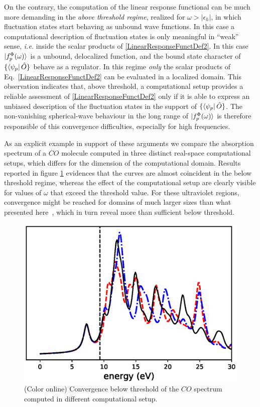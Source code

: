 \documentclass[reprint,aps,prb]{revtex4-1}
\newcommand{\eps}{\epsilon}
\newcommand{\op}[1]{\hat {#1}}
\begin{document}
On the contrary, the computation of the linear response functional can be much more demanding in the \emph{above threshold regime}, realized for $\omega>|\eps_h|$, in which fluctuation 
states start behaving as unbound wave functions. In this case a computational description of fluctuation states is only meaningful in ``weak'' sense,
\emph{i.e.} inside the scalar products of 
\eqref{LinearResponseFunctDef2}. 
In this case $\ket{f_p^\Phi(\omega)}$ is a unbound, delocalized function, and 
the bound state character of $\{\bra{\psi_p}\op O\}$ behave as a regulator. 
In this regime \emph{only} the scalar products of Eq.~\eqref{LinearResponseFunctDef2} can be evaluated in a localized domain.
This observation indicates that, above threshold, a computational setup 
provides a reliable assessment of \eqref{LinearResponseFunctDef2} only if it is able to express an
unbiased description of the fluctuation states in the support of $\{\bra{\psi_p}\op O\}$.
The non-vanishing spherical-wave behaviour in the long range of $\ket{f_p^\Phi(\omega)}$ is therefore responsible
of this convergence difficulties, especially for high frequencies.

As an explicit example in support of these arguments we compare the absorption spectrum of a $CO$ molecule computed in 
three distinct real-space computational setups, which differs for the dimension of 
the computational domain. Results reported in figure \ref{co_spectrum} evidences that the curves are almost coincident in the below threshold regime,
whereas the effect of the computational setup are clearly visible for values of $\omega$ that exceed the threshold value.
For these ultraviolet regions, convergence might be reached for domains of much larger sizes than what presented here~\cite{baroni2008},
which in turn reveal more than sufficient below threshold.

\begin{figure}
\includegraphics[scale=0.56]{co_spectrum.eps}
\caption{\label{co_spectrum}(Color online) Convergence below threshold of the $CO$ spectrum computed in different computational setup.}
\end{figure}
\end{document}
